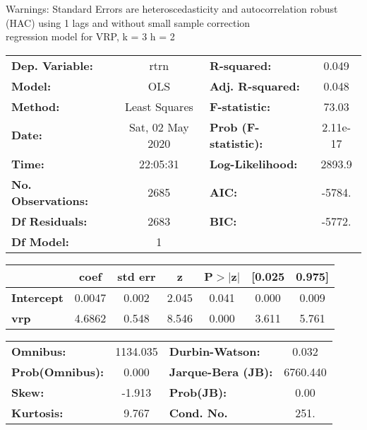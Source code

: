 Warnings: \newline
 [1] Standard Errors are heteroscedasticity and autocorrelation robust (HAC) using 1 lags and without small sample correction\\ 

regression model for VRP, k = 3 h = 2\begin{center}
\begin{tabular}{lclc}
\toprule
\textbf{Dep. Variable:}    &       rtrn       & \textbf{  R-squared:         } &     0.049   \\
\textbf{Model:}            &       OLS        & \textbf{  Adj. R-squared:    } &     0.048   \\
\textbf{Method:}           &  Least Squares   & \textbf{  F-statistic:       } &     73.03   \\
\textbf{Date:}             & Sat, 02 May 2020 & \textbf{  Prob (F-statistic):} &  2.11e-17   \\
\textbf{Time:}             &     22:05:31     & \textbf{  Log-Likelihood:    } &    2893.9   \\
\textbf{No. Observations:} &        2685      & \textbf{  AIC:               } &    -5784.   \\
\textbf{Df Residuals:}     &        2683      & \textbf{  BIC:               } &    -5772.   \\
\textbf{Df Model:}         &           1      & \textbf{                     } &             \\
\bottomrule
\end{tabular}
\begin{tabular}{lcccccc}
                   & \textbf{coef} & \textbf{std err} & \textbf{z} & \textbf{P$> |$z$|$} & \textbf{[0.025} & \textbf{0.975]}  \\
\midrule
\textbf{Intercept} &       0.0047  &        0.002     &     2.045  &         0.041        &        0.000    &        0.009     \\
\textbf{vrp}       &       4.6862  &        0.548     &     8.546  &         0.000        &        3.611    &        5.761     \\
\bottomrule
\end{tabular}
\begin{tabular}{lclc}
\textbf{Omnibus:}       & 1134.035 & \textbf{  Durbin-Watson:     } &    0.032  \\
\textbf{Prob(Omnibus):} &   0.000  & \textbf{  Jarque-Bera (JB):  } & 6760.440  \\
\textbf{Skew:}          &  -1.913  & \textbf{  Prob(JB):          } &     0.00  \\
\textbf{Kurtosis:}      &   9.767  & \textbf{  Cond. No.          } &     251.  \\
\bottomrule
\end{tabular}
\end{center}

